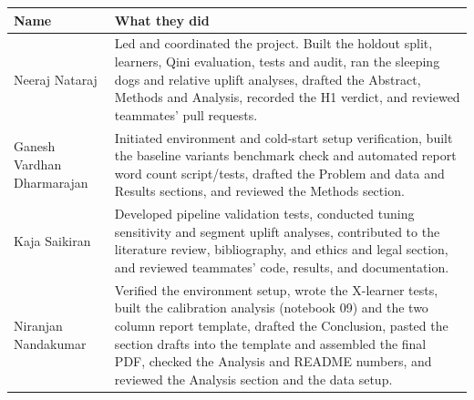 \par\medskip
\noindent
\begin{minipage}{\textwidth}
  \centering
  \begin{tabularx}{\textwidth}{@{}>{\raggedright\arraybackslash\hyphenpenalty=10000\exhyphenpenalty=10000}p{3.4cm}>{\raggedright\arraybackslash}X@{}}
    \toprule
    Name & What they did \\
    \midrule
    Neeraj Nataraj & Led and coordinated the project. Built the holdout split, learners, Qini evaluation, tests and audit, ran the sleeping dogs and relative uplift analyses, drafted the Abstract, Methods and Analysis, recorded the H1 verdict, and reviewed teammates' pull requests. \\
    \addlinespace
    Ganesh Vardhan Dharmarajan & Initiated environment and cold-start setup verification, built the baseline variants benchmark check and automated report word count script/tests, drafted the Problem and data and Results sections, and reviewed the Methods section. \\
    \addlinespace
    Kaja Saikiran & Developed pipeline validation tests, conducted tuning sensitivity and segment uplift analyses, contributed to the literature review, bibliography, and ethics and legal section, and reviewed teammates' code, results, and documentation. \\
    \addlinespace
    Niranjan Nandakumar & Verified the environment setup, wrote the X-learner tests, built the calibration analysis (notebook 09) and the two column report template, drafted the Conclusion, pasted the section drafts into the template and assembled the final PDF, checked the Analysis and README numbers, and reviewed the Analysis section and the data setup. \\
    \bottomrule
  \end{tabularx}
\end{minipage}
\par\medskip
